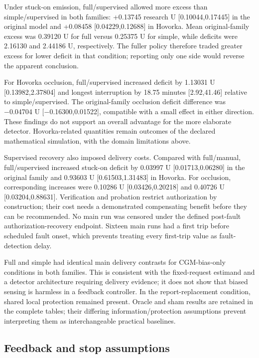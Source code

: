 \documentclass[journal,10pt,letterpaper]{IEEEtran}
\begin{document}
Under stuck-on emission, full/supervised allowed more excess than
simple/supervised in both families: +0.13745 research U
{[}0.10044,0.17445{]} in the original model and +0.08458
{[}0.04229,0.12688{]} in Hovorka. Mean original-family excess was
0.39120 U for full versus 0.25375 U for simple, while deficits were
2.16130 and 2.44186 U, respectively. The fuller policy therefore traded
greater excess for lower deficit in that condition; reporting only one
side would reverse the apparent conclusion.

For Hovorka occlusion, full/supervised increased deficit by 1.13031 U
{[}0.13982,2.37804{]} and longest interruption by 18.75 minutes
{[}2.92,41.46{]} relative to simple/supervised. The original-family
occlusion deficit difference was −0.04704 U {[}−0.16300,0.01522{]},
compatible with a small effect in either direction. These findings do
not support an overall advantage for the more elaborate detector.
Hovorka-related quantities remain outcomes of the declared mathematical
simulation, with the domain limitations above.

Supervised recovery also imposed delivery costs. Compared with
full/manual, full/supervised increased stuck-on deficit by 0.03997 U
{[}0.01713,0.06280{]} in the original family and 0.93603 U
{[}0.61503,1.31483{]} in Hovorka. For occlusion, corresponding increases
were 0.10286 U {[}0.03426,0.20218{]} and 0.40726 U
{[}0.03204,0.88631{]}. Verification and probation restrict authorization
by construction; their cost needs a demonstrated compensating benefit
before they can be recommended. No main run was censored under the
defined post-fault authorization-recovery endpoint. Sixteen main runs
had a first trip before scheduled fault onset, which prevents treating
every first-trip value as fault-detection delay.

Full and simple had identical main delivery contrasts for CGM-bias-only
conditions in both families. This is consistent with the fixed-request
estimand and a detector architecture requiring delivery evidence; it
does not show that biased sensing is harmless in a feedback controller.
In the report-replacement condition, shared local protection remained
present. Oracle and sham results are retained in the complete tables;
their differing information/protection assumptions prevent interpreting
them as interchangeable practical baselines.

\subsection{Feedback and stop assumptions}
\end{document}
